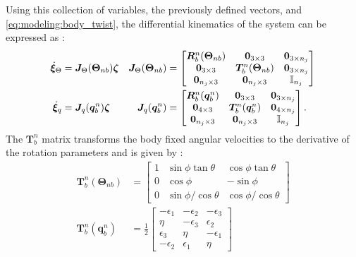 Using this collection of variables,
the previously defined vectors, and \autoref{eq:modeling:body_twist}, 
the differential kinematics of the system can be expressed as \cite{fossen2021}:
\begin{subequations}
\label{eq:mod:jac}
\begin{align}
    \dot{\bm{\xi}}_{\Theta} &= \bm{J}_{\Theta}(\bm{\Theta}_{nb})\bm{\zeta} &
    \bm{J}_{\Theta}(\bm{\Theta}_{nb}) &= \begin{bmatrix}
        \bm{R}_{b}^n(\bm{\Theta}_{nb}) & \bm{0}_{3 \times 3} & \bm{0}_{3 \times n_j} \\
        \bm{0}_{3 \times 3} & \bm{T}_{b}^n(\bm{\Theta}_{nb}) & \bm{0}_{3 \times n_j} \\
        \bm{0}_{n_j \times 3} & \bm{0}_{n_j \times 3} & \mathbb{I}_{n_j}
    \end{bmatrix} \\
    \dot{\bm{\xi}}_{q} &= \bm{J}_{q}(\bm{q}_{b}^n)\bm{\zeta} &
    \bm{J}_{q}(\bm{q}_{b}^n) &= \begin{bmatrix}
        \bm{R}_{b}^n(\bm{q}_{b}^n) & \bm{0}_{3 \times 3} & \bm{0}_{3 \times n_j} \\
        \bm{0}_{4 \times 3} & \bm{T}_{b}^n(\bm{q}_{b}^n) & \bm{0}_{4 \times n_j} \\
        \bm{0}_{n_j \times 3} & \bm{0}_{n_j \times 3} & \mathbb{I}_{n_j}
    \end{bmatrix}.
\end{align}
\end{subequations}
The $\bm{T}_b^n$ matrix transforms the body fixed angular velocities to the derivative of the
rotation parameters and is given by \cite{fossen2021}:
\begin{subequations}
    \begin{align}
        \bm{T}_b^n(\bm{\Theta}_{nb}) &= \begin{bmatrix}
            1 & \sin\phi \tan\theta & \cos \phi \tan \theta \\
            0 & \cos \phi & -\sin\phi \\
            0 & \sin \phi / \cos \theta & \cos \phi / \cos \theta
        \end{bmatrix} \\
        \bm{T}_b^n(\bm{q}_{b}^n) &= \frac{1}{2}\begin{bmatrix}
            -\epsilon_1 & -\epsilon_2 & -\epsilon_3 \\
            \eta & -\epsilon_3 & \epsilon_2 \\
            \epsilon_3 & \eta & -\epsilon_1 \\
            -\epsilon_2 & \epsilon_1 & \eta
        \end{bmatrix}
    \end{align}
\end{subequations}

